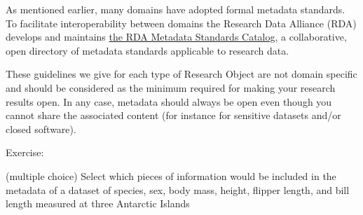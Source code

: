 \documentclass[
  letterpaper,
  DIV=11,
  numbers=noendperiod]{scrreport}
\begin{document}
As mentioned earlier, many domains have adopted formal metadata
standards. To facilitate interoperability between domains the Research
Data Alliance (RDA) develops and maintains
\href{https://rdamsc.bath.ac.uk/}{the RDA Metadata Standards Catalog}, a
collaborative, open directory of metadata standards applicable to
research data.

These guidelines we give for each type of Research Object are not domain
specific and should be considered as the minimum required for making
your research results open. In any case, metadata should always be open
even though you cannot share the associated content (for instance for
sensitive datasets and/or closed software).

Exercise:

(multiple choice) Select which pieces of information would be included
in the metadata of a dataset of species, sex, body mass, height, flipper
length, and bill length measured at three Antarctic Islands
\end{document}
